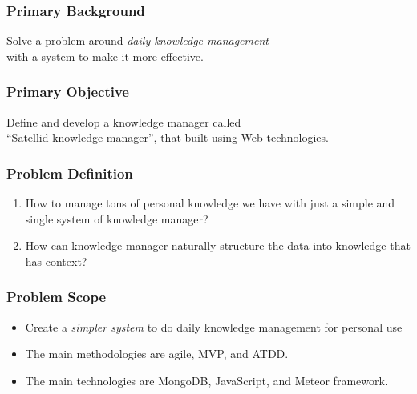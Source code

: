 \documentclass[10pt, compress]{beamer}
\begin{document}

\begin{frame}[fragile]
  \frametitle{Primary Background}

  Solve a problem around \alert{\emph{daily knowledge management}} \\
  with a system to make it more effective.

\end{frame}


\begin{frame}[fragile]
  \frametitle{Primary Objective}

  Define and develop a knowledge manager called\\
  \alert{``Satellid knowledge manager''},
  that built using Web technologies.

\end{frame}


\begin{frame}[fragile]
  \frametitle{Problem Definition}

  \begin{enumerate}
    \item How to manage tons of personal knowledge we have with just a simple and single system of knowledge manager?
    \item How can knowledge manager naturally structure the data into knowledge that has context?
  \end{enumerate}

\end{frame}


\begin{frame}[fragile]
  \frametitle{Problem Scope}

  \begin{itemize} \itemsep0pt
    \item Create a \alert{\emph{simpler system}} to do daily knowledge management for personal use
    \item The main methodologies are agile, MVP, and ATDD.
    \item The main technologies are MongoDB, JavaScript, and Meteor framework.
  \end{itemize}

\end{frame}
\end{document}
